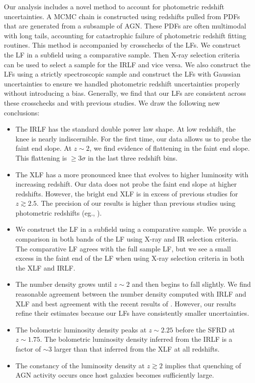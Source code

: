 \documentclass[twocolumn, trackchanges]{aastex63}
\begin{document}
Our analysis includes a novel method to account for photometric redshift uncertainties.
A MCMC chain is constructed using redshifts pulled from PDFs that are generated from a subsample of AGN.
These PDFs are often multimodal with long tails, accounting for catastrophic failure of photometric redshift fitting routines.
This method is accompanied by crosschecks of the LFs.
We construct the LF in a subfield using a comparative sample. 
Then X-ray selection criteria can be used to select a sample for the IRLF and vice versa.
We also construct the LFs using a strictly spectroscopic sample and construct the LFs with Gaussian uncertainties to ensure we handled photometric redshift uncertainties properly without introducing a bias.
Generally, we find that our LFs are consistent across these crosschecks and with previous studies.
We draw the following new conclusions:
\begin{itemize}
\item The IRLF has the standard double power law shape. At low redshift, the knee is nearly indiscernible. For the first time, our data allows us to probe the faint end slope. At $z\sim 2$, we find evidence of flattening in the faint end slope. This flattening is $\geq 3\sigma$ in the last three redshift bins.
\item The XLF has a more pronounced knee that evolves to higher luminosity with increasing redshift. Our data does not probe the faint end slope at higher redshifts. However, the bright end XLF is in excess of previous studies for $z\gtrsim 2.5$. The precision of our results is higher than previous studies using photometric redshifts (eg., \cite{ranalli_210_2016}).
\item We construct the LF in a subfield using a comparative sample. We provide a comparison in both bands of the LF using X-ray and IR selection criteria. The comparative LF agrees with the full sample LF, but we see a small excess in the faint end of the LF when using X-ray selection criteria in both the XLF and IRLF.
\item The number density grows until $z\sim 2$ and then begins to fall slightly. We find reasonable agreement between the number density computed with IRLF and XLF and best agreement with the recent results of \cite{ranalli_210_2016}. However, our results refine their estimates because our LFs have consistently smaller uncertainties.
\item The bolometric luminosity density peaks at $z\sim 2.25$ before the SFRD at $z\sim1.75$. The bolometric luminosity density inferred from the IRLF is a factor of $\sim3$ larger than that inferred from the XLF at all redshifts. 
\item The constancy of the luminosity density at $z\gtrsim2$ implies that quenching of AGN activity occurs once host galaxies becomes sufficiently large.
\end{itemize}
\end{document}
